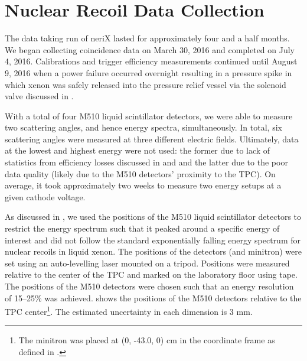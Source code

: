 \section{Nuclear Recoil Data Collection}

The data taking run of neriX lasted for approximately four and a half months.  We began collecting coincidence data on March 30, 2016 and completed on July 4, 2016.  Calibrations and trigger efficiency measurements continued until August 9, 2016 when a power failure occurred overnight resulting in a pressure spike in which xenon was safely released into the pressure relief vessel via the solenoid valve discussed in .

With a total of four M510 liquid scintillator detectors, we were able to measure two scattering angles, and hence energy spectra, simultaneously.  In total, six scattering angles were measured at three different electric fields.  Ultimately, data at the lowest and highest energy were not used: the former due to lack of statistics from efficiency losses discussed in  and  and the latter due to the poor data quality (likely due to the M510 detectors' proximity to the TPC).  On average, it took approximately two weeks to measure two energy setups at a given cathode voltage.

As discussed in , we used the positions of the M510 liquid scintillator detectors to restrict the energy spectrum such that it peaked around a specific energy of interest and did not follow the standard exponentially falling energy spectrum for nuclear recoils in liquid xenon.  The positions of the detectors (and minitron) were set using an auto-levelling laser mounted on a tripod.  Positions were measured relative to the center of the TPC and marked on the laboratory floor using tape.  The positions of the M510 detectors were chosen such that an energy resolution of 15--25\% was achieved.   shows the positions of the M510 detectors relative to the TPC center\footnote{The minitron was placed at (0, -43.0, 0) cm in the coordinate frame as defined in .}.  The estimated uncertainty in each dimension is 3 mm.



